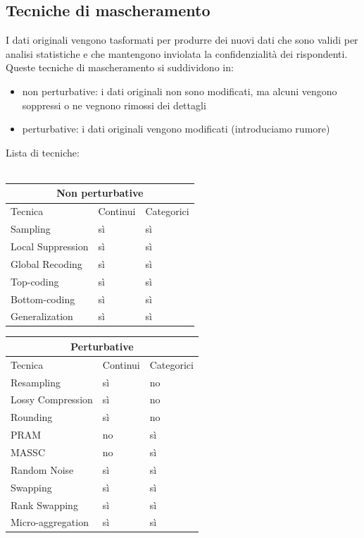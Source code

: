 \subsection{Tecniche di mascheramento}
I dati originali vengono tasformati per produrre dei nuovi dati che sono validi per analisi statistiche e che mantengono inviolata la confidenzialità dei rispondenti. Queste tecniche di mascheramento si suddividono in:
\begin{itemize}
    \item non perturbative: i dati originali non sono modificati, ma alcuni vengono soppressi o ne vegnono rimossi dei dettagli
    \item perturbative: i dati originali vengono modificati (introduciamo rumore)
\end{itemize}
Lista di tecniche:\\\\

\begin{tabular}{ |p{3cm}||p{3cm}|p{3cm}|  }
 \hline
 \multicolumn{3}{|c|}{Non perturbative} \\
 \hline
Tecnica & Continui & Categorici \\
 \hline
Sampling & sì & sì  \\
Local Suppression & sì & sì  \\
Global Recoding & sì & sì  \\
Top-coding & sì & sì  \\
Bottom-coding & sì & sì  \\
Generalization & sì & sì  \\
 \hline
\end{tabular}

\begin{tabular}{ |p{3cm}||p{3cm}|p{3cm}|  }
 \hline
 \multicolumn{3}{|c|}{Perturbative} \\
 \hline
Tecnica & Continui & Categorici \\
 \hline
Resampling & sì & no  \\
Lossy Compression & sì & no  \\
Rounding & sì & no  \\
PRAM & no & sì  \\
MASSC & no & sì  \\
Random Noise & sì & sì  \\
Swapping & sì & sì  \\
Rank Swapping & sì & sì  \\
Micro-aggregation & sì & sì  \\
 \hline
\end{tabular}

